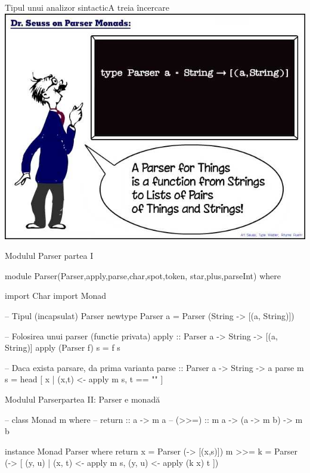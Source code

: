 \documentclass[xcolor=pdftex,romanian,colorlinks]{beamer}
\begin{document}
%
%
%
\begin{frame}[fragile]{Tipul unui analizor sintactic}{A treia încercare}
\hfill \href{http://www.willamette.edu/~fruehr/haskell/seuss.html}{\includegraphics[scale=.4]{SeussFinal2}}\hfill\;
\end{frame}

\begin{frame}[fragile]{Modulul Parser}
{partea I}
\begin{asciihs}
  module Parser(Parser,apply,parse,char,spot,token,
    star,plus,parseInt) where

  import Char
  import Monad

  -- Tipul (incapsulat) Parser
  newtype Parser a = Parser (String -> [(a, String)])

  -- Folosirea unui parser (functie privata)
  apply :: Parser a -> String -> [(a, String)]
  apply (Parser f) s = f s

  -- Daca exista parsare, da prima varianta
  parse :: Parser a -> String -> a
  parse m s = head [ x | (x,t) <- apply m s, t == "" ]
\end{asciihs}
\end{frame}



\begin{frame}[fragile]{Modulul Parser}{partea II: Parser e monadă}
\begin{asciihs}

  --   class Monad m where
  --     return :: a -> m a
  --     (>>=) :: m a -> (a -> m b) -> m b

  instance Monad Parser where
    return x  = Parser (\s -> [(x,s)])
    m >>= k   = Parser (\s ->
                   [ (y, u) |
                     (x, t) <- apply m s,
                     (y, u) <- apply (k x) t ])
\end{asciihs}
\end{frame}
\end{document}

